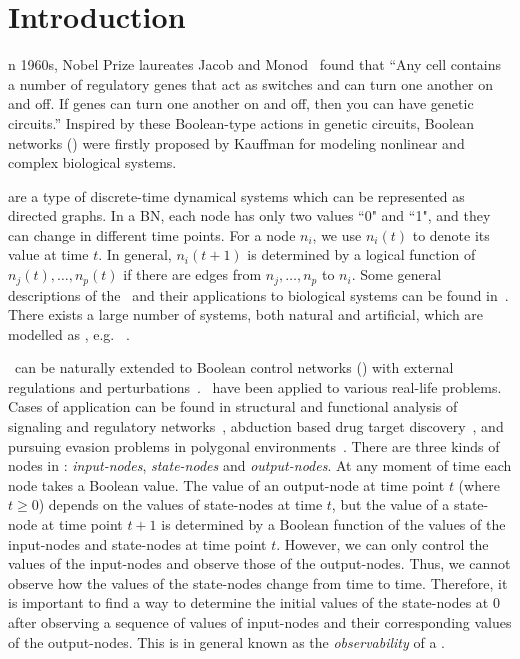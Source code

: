 

\section{Introduction}
\label{sec:intro}


n 1960s, Nobel Prize laureates Jacob and Monod~\cite{Jacob1961Genetic} found that ``Any cell contains a number of regulatory genes that act as switches and can turn one another on and off. If genes can turn one another on and off, then you can have genetic circuits.'' Inspired by these Boolean-type actions in genetic circuits, Boolean networks (\BNs) were firstly proposed by Kauffman \cite{Kauffman1968Metabolic} for modeling nonlinear and complex biological systems. 

{\BNs} are a type of discrete-time dynamical systems which can be represented as directed graphs. In a BN, each node has only two values ``0" and ``1", and they can change in different time points.  For a node $n_i$, we use $n_i(t)$ to denote its value at time $t$.
In general, $n_i(t+1)$ is determined by a logical function of $n_j(t),\ldots,n_p(t)$ if  there are  edges from $n_j,\ldots,n_p$ to $n_i$.  
Some general descriptions of the \BNs\ and their applications to biological systems can be found in~\cite{Kauffman1968Metabolic}. There exists a large number of  systems, both natural and artificial, which are modelled as \BNs, e.g. ~\cite{Akutsu2000Inferring, Shmulevich2002From, Faur2006Dynamical,Green2007The,Lou2010Multi}.

\BNs\ can be naturally extended to Boolean control networks (\BCNs) with external regulations and perturbations~\cite{Ideker2001A}. \BCNs\ have been applied to  various real-life problems. Cases of application can be found in 
structural and functional analysis of signaling and regulatory networks~\cite{Kaufman1999A, Klamt2006A}, 
abduction based drug target discovery~\cite{Biane2017Abduction}, 
and pursuing evasion problems in polygonal environments~\cite{Thunberg2011A}.
%
There are three kinds of nodes in \BCNs:  {\em input-nodes}, {\em state-nodes}  and {\em output-nodes}. At any moment of time each node takes a Boolean value.  The value of an output-node at time point $t$ (where $t\geq 0$)  depends on the values of state-nodes at time $t$, but the value of a  state-node at time point $t+1$  is determined by a  Boolean function of the values of the input-nodes and state-nodes at time point $t$. However,  we can only control the  values of the input-nodes and observe those of the output-nodes. Thus,  we cannot observe how   the values of the state-nodes change from time to time. Therefore, it is important to find a way to determine the initial values of the state-nodes at $0$ after observing a sequence of values of  input-nodes and their corresponding  values of the output-nodes. This is in general known as the {\em observability} of a \BCN.



